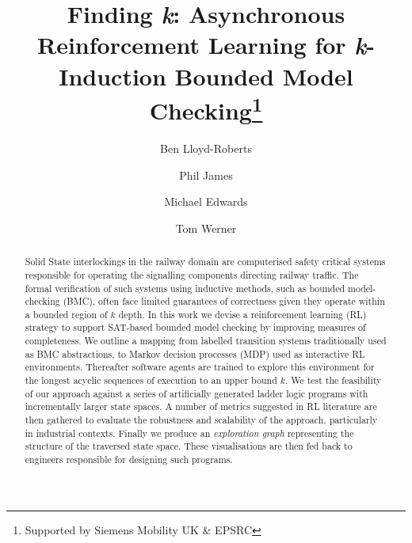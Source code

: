 \documentclass[runningheads]{llncs}
\begin{document}
%
\title{Finding \textit{k}: Asynchronous Reinforcement Learning for \textit{k}-Induction Bounded Model Checking\thanks{Supported by Siemens Mobility UK \& EPSRC}}
%
%
\author{Ben Lloyd-Roberts \and
Phil James \and
Michael Edwards \and 
Tom Werner}
%
%


%
\maketitle              %
%
\begin{abstract}
Solid State interlockings in the railway domain are computerised safety critical systems responsible for operating the signalling components directing railway traffic. The formal verification of such systems using inductive methods, such as bounded model-checking (BMC), often face limited guarantees of correctness given they operate within a bounded region of $k$ depth. In this work we devise a reinforcement learning (RL) strategy to support SAT-based bounded model checking by improving measures of completeness. We outline a mapping from labelled transition systems traditionally used as BMC abstractions, to Markov decision processes (MDP) used as interactive RL environments. Thereafter software agents are trained to explore this environment for the longest acyclic sequences of execution to an upper bound $k$. We test the feasibility of our approach against a series of artificially generated ladder logic programs with incrementally larger state spaces. A number of metrics suggested in RL literature are then gathered to evaluate the robustness and scalability of the approach, particularly in industrial contexts. Finally we produce an \textit{exploration graph} representing the structure of the traversed state space. These visualisations are then fed back to engineers responsible for designing such programs.

\end{abstract}
\end{document}
